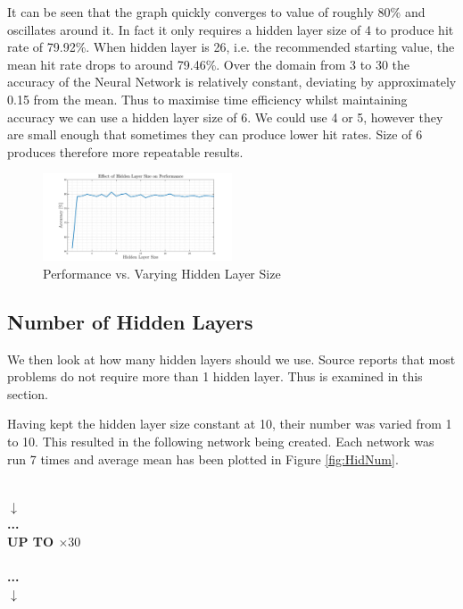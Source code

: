 \documentclass[10pt,twocolumn,letterpaper]{article}
\begin{document}
It can be seen that the graph quickly converges to value of roughly 80\% and oscillates around it. In fact it only requires a hidden layer size of 4 to produce hit rate of 79.92\%. When hidden layer is 26, i.e. the recommended starting value, the mean hit rate drops to around 79.46\%. Over the domain from 3 to 30 the accuracy of the Neural Network is relatively constant, deviating by approximately 0.15 from the mean. Thus to maximise time efficiency whilst maintaining accuracy we can use a hidden layer size of 6. We could use 4 or 5, however they are small enough that sometimes they can produce lower hit rates. Size of 6 produces therefore more repeatable results.

\begin{figure}[H]
\centering
\includegraphics[width=0.5\textwidth]{../results/NN_HiddenLayer}
\caption{Performance vs. Varying Hidden Layer Size
\label{fig:HidSiz}}
\end{figure}

\subsection{Number of Hidden Layers}

We then look at how many hidden layers should we use. Source \cite{NN_Java} reports that most problems do not require more than 1 hidden layer. Thus is examined in this section.

Having kept the hidden layer size constant at 10, their number was varied from 1 to 10. This resulted in the following network being created. Each network was run 7 times and average mean has been plotted in Figure \ref{fig:HidNum}.

\begin{center}
 \\

\centering
$\downarrow$ \\
\bf ... \\
{\bf  \tiny UP TO $\times 30$}\\
\centering
{}\\

\centering
\bf ... \\
$\downarrow$\\

\centering
{}\\

\end{center}
\end{document}
